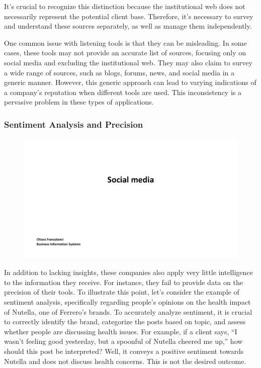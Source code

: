 It's crucial to recognize this distinction because the institutional web
does not necessarily represent the potential client base. Therefore,
it's necessary to survey and understand these sources separately, as
well as manage them independently.

One common issue with listening tools is that they can be misleading. In
some cases, these tools may not provide an accurate list of sources,
focusing only on social media and excluding the institutional web. They
may also claim to survey a wide range of sources, such as blogs, forums,
news, and social media in a generic manner. However, this generic
approach can lead to varying indications of a company's reputation when
different tools are used. This inconsistency is a pervasive problem in
these types of applications.

\subsubsection{Sentiment Analysis and
    Precision}\label{sentiment-analysis-and-precision}

\begin{figure}[!h]
    \centering
    \includegraphics[page=31, trim = 1.5cm 1.8cm 2.5cm 0.5cm, clip, width=\textwidth]{images/04 - Social_Media.pdf}
\end{figure}

In addition to lacking insights, these companies also apply very little
intelligence to the information they receive. For instance, they fail to
provide data on the precision of their tools. To illustrate this point,
let's consider the example of sentiment analysis, specifically regarding
people's opinions on the health impact of Nutella, one of Ferrero's brands.
To accurately analyze sentiment, it is crucial to correctly identify the
brand, categorize the posts based on topic, and assess whether people
are discussing health issues. For example, if a client says, ``I wasn't
feeling good yesterday, but a spoonful of Nutella cheered me up,'' how
should this post be interpreted? Well, it conveys a positive sentiment
towards Nutella and does not discuss health concerns. This is not the
desired outcome.

